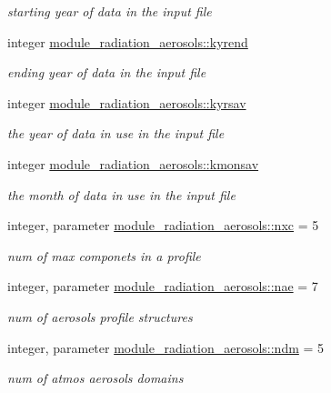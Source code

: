 \begin{DoxyCompactItemize}
\begin{DoxyCompactList}\small\item\em starting year of data in the input file \end{DoxyCompactList}\item 
integer \hyperlink{group__module__radiation__aerosols_ga79127786cce93bccf8749ef8c85f6467}{module\+\_\+radiation\+\_\+aerosols\+::kyrend}
\begin{DoxyCompactList}\small\item\em ending year of data in the input file \end{DoxyCompactList}\item 
integer \hyperlink{group__module__radiation__aerosols_ga928c08857f866e4b848873a23a1d49e7}{module\+\_\+radiation\+\_\+aerosols\+::kyrsav}
\begin{DoxyCompactList}\small\item\em the year of data in use in the input file \end{DoxyCompactList}\item 
integer \hyperlink{group__module__radiation__aerosols_ga302ae8a5aa2b8fb08ad366ef124cee45}{module\+\_\+radiation\+\_\+aerosols\+::kmonsav}
\begin{DoxyCompactList}\small\item\em the month of data in use in the input file \end{DoxyCompactList}\item 
integer, parameter \hyperlink{group__module__radiation__aerosols_ga1fffbb55ad2986a216b721a6c103c4cf}{module\+\_\+radiation\+\_\+aerosols\+::nxc} = 5
\begin{DoxyCompactList}\small\item\em num of max componets in a profile \end{DoxyCompactList}\item 
integer, parameter \hyperlink{group__module__radiation__aerosols_ga45121ca4dcb3194e8afb4090fa810657}{module\+\_\+radiation\+\_\+aerosols\+::nae} = 7
\begin{DoxyCompactList}\small\item\em num of aerosols profile structures \end{DoxyCompactList}\item 
integer, parameter \hyperlink{group__module__radiation__aerosols_gae77b22f76f193cef19b6e6c3ee8e0773}{module\+\_\+radiation\+\_\+aerosols\+::ndm} = 5
\begin{DoxyCompactList}\small\item\em num of atmos aerosols domains \end{DoxyCompactList}\item 

\end{DoxyCompactItemize}
